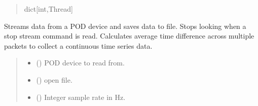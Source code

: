 \documentclass[letterpaper,10pt,english]{sphinxmanual}
\begin{document}
\begin{fulllineitems}
\begin{fulllineitems}
\begin{quote}
\begin{description}
\sphinxAtStartPar
dict{[}int,Thread{]}

\end{description}\end{quote}

\end{fulllineitems}


\begin{fulllineitems}
\label{\detokenize{Setup_8401HR:Setup_8401HR.Setup_8401HR._StreamUntilStop}}
\pysigstartsignatures
{}
\pysigstopsignatures
\sphinxAtStartPar
Streams data from a POD device and saves data to file. Stops looking when a stop         stream command is read. Calculates average time difference across multiple packets to         collect a continuous time series data.
\begin{quote}\begin{description}
\begin{itemize}
\item {} 
\sphinxAtStartPar
{} ({\hyperref[\detokenize{PodDevice_8206HR:PodDevice_8206HR.POD_8206HR}]{}}) \textendash{} POD device to read from.

\item {} 
\sphinxAtStartPar
{} (\sphinxstyleliteralemphasis{\sphinxupquote{ | }}) \textendash{} open file.

\item {} 
\sphinxAtStartPar
{} () \textendash{} Integer sample rate in Hz.


\end{itemize}
\end{description}
\end{quote}
\end{fulllineitems}
\end{fulllineitems}
\end{document}
